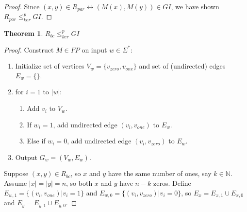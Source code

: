 \documentclass{article}
\newtheorem{theorem}{Theorem}[section]
\theoremstyle{definition}
\newcommand{\sigmastar}{\Sigma^{*}}
\newcommand{\kr}{\leq^{p}_{ker}}
\begin{document}
\begin{proof}
  Since $(x,y)\in R_{par} \leftrightarrow (M(x), M(y)) \in GI$, we have shown
  $R_{par} \kr GI$.
\end{proof}

\begin{theorem}$R_{bc}\kr GI$\end{theorem}
\begin{proof}
  Construct $M\in FP$ on input $w \in \sigmastar$:
  \begin{enumerate}
  \item Initialize set of vertices $V_w=\{v_{zero}, v_{one}\}$ and set of
    (undirected) edges $E_w=\{\}$.
  \item for $i=1$ to $|w|$:
    \begin{enumerate}
    \item Add $v_i$ to $V_w$.
    \item If $w_i = 1$, add undirected edge $(v_i, v_{one})$ to $E_w$.
    \item Else if $w_i = 0$, add undirected edge $(v_i, v_{zero})$ to $E_w$.
    \end{enumerate}
  \item Output $G_w=(V_w,E_w)$.
  \end{enumerate}
  
  Suppose $(x,y)\in R_{bc}$, so $x$ and $y$ have the same number of ones, say
  $k\in\mathbb{N}$. Assume $|x|=|y|=n$, so both $x$ and $y$ have $n-k$
  zeros. Define $E_{w,1}=\{(v_i, v_{one})|v_i = 1\}$ and $E_{w,0}=\{(v_i,
  v_{zero})|v_i = 0\}$, so $E_x = E_{x,1}\cup E_{x,0}$ and $E_y = E_{y,1} \cup
  E_{y,0}$.
\end{proof}
\end{document}
